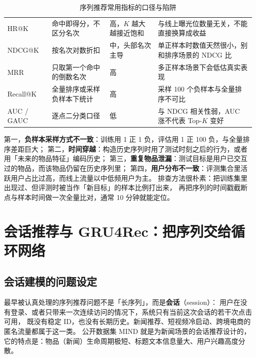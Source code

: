 \begin{table}[htbp]
\centering
\caption{序列推荐常用指标的口径与陷阱}
\label{tab:seq-metrics}
\small
\begin{tabularx}{\textwidth}{L{2.0cm} L{3.6cm} L{2.4cm} Y}
\toprule
{} &  &  &  \\
\midrule
HR@K & 命中即得分，不区分名次 & 高，$K$ 越大越接近饱和 & 与线上曝光位数量无关，不能直接换算成收益 \\
\addlinespace
NDCG@K & 按名次对数折扣 & 中，头部名次主导 & 单正样本时数值天然很小，别和排序场景的 NDCG 比 \\
\addlinespace
MRR & 只取第一个命中的倒数名次 & 高 & 多正样本场景下会低估真实表现 \\
\addlinespace
Recall@K & 全量排序或采样负样本下统计 & 高 & 采样 100 个负样本与全量排序不可比 \\
\addlinespace
AUC / GAUC & 逐点二分类口径 & 低 & 与 NDCG 相关性弱，AUC 涨不代表 Top-$K$ 变好 \\
\bottomrule
\end{tabularx}
\end{table}

\begin{pitfall}
第一，\textbf{负样本采样方式不一致}：训练用 1 正 1 负，评估用 1 正 100 负，与全量排序差距巨大；
第二，\textbf{时间穿越}：构造历史序列时用了测试时刻之后的行为，或者用「未来的物品特征」编码历史；
第三，\textbf{重复物品泄漏}：测试目标是用户已交互过的物品，而该物品仍留在历史序列里；
第四，\textbf{用户分布不一致}：评测集合里活跃用户占比过高，而线上流量以中低频用户为主。
排查方法很朴素：把训练集里出现过、但评测时被当作「新目标」的样本比例打出来，
再把序列的时间戳截断点与样本时间做一次全量比对，通常 10 分钟就能定位。
\end{pitfall}

\section{会话推荐与 GRU4Rec：把序列交给循环网络}

\subsection{会话建模的问题设定}

最早被认真处理的序列推荐问题不是「长序列」，而是\textbf{会话}（session）：
用户在没有登录、或者只带来一次连续访问的情况下，系统只有当前这次会话的若干次点击可用，
既没有稳定 ID，也没有长期历史。新闻推荐、短视频冷启动、跨境电商的匿名流量都属于这一类。
公开数据集 MIND \cite{chen2019mind} 就是为新闻场景的会话推荐设计的，
它的特点是：物品（新闻）生命周期极短、标题文本信息量大、用户兴趣高度分散。

